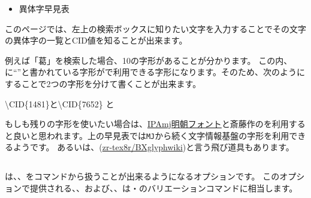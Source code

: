 \documentclass[../otf-unofficial-guide]{subfiles}
\begin{document}
\begin{itemize}
  \item 異体字早見表
\end{itemize}

このページでは、左上の検索ボックスに知りたい文字を入力することでその文字の異体字の一覧とCID値を知ることが出来ます。

例えば「葛」を検索した場合、10の字形があることが分かります。
この内、に``{\AdobeJapan}''と書かれている字形がで利用できる字形になります。そのため、次のようにすることで2つの字形を分けて書くことが出来ます。

\begin{demosource}
  {\textbackslash}CID\{1481\}と{\textbackslash}CID\{7652\}
  \tcblower
  \large
  と
\end{demosource}

もしも残りの字形を使いたい場合は、\href{https://moji.or.jp/mojikiban/font/}{IPAmj明朝フォント}と斎藤{\氏}作の\href{https://psitau.kitunebi.com/experiment.html}{}を利用すると良いと思われます。上の早見表では\texttt{MJ}から続く文字情報基盤の字形を利用できるようです。
あるいは、(\href{https://github.com/zr-tex8r/BXglyphwiki}{\textsf{zr-{\allowbreak}tex8r/BXglyphwiki}})と言う飛び道具もあります。



\subsection{\texorpdfstring{}{multiオプション}}

は{\fantizi}、{\jiantizi}、{\hankgo}をコマンドから扱うことが出来るようになるオプションです。
このオプションで提供される、、および、、は・のバリエーションコマンドに相当します。
\end{document}
